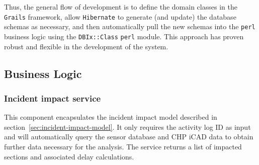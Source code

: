 \documentclass[12pt]{report}
\begin{document}
Thus, the general flow of development is to define the domain classes in the
\texttt{Grails} framework, allow \texttt{Hibernate} to generate (and update) the
database schemas as necessary, and then automatically pull the new schemas into
the \texttt{perl} business logic using the \texttt{DBIx::Class} \texttt{perl}
module.  This approach has proven robust and flexible in the development of the
system.


\subsection{Business Logic}
\label{sec:logic}


\subsubsection{Incident impact service}

\label{sec:incident-impact-service}

This component encapsulates the incident impact model described in
section~\ref{sec:incident-impact-model}.  It only requires the
activity log ID as input and will automatically query the sensor
database and \ac{CHP} \ac{iCAD} data to obtain further data necessary
for the analysis.  The service returns a list of impacted sections and
associated delay calculations.
\end{document}
